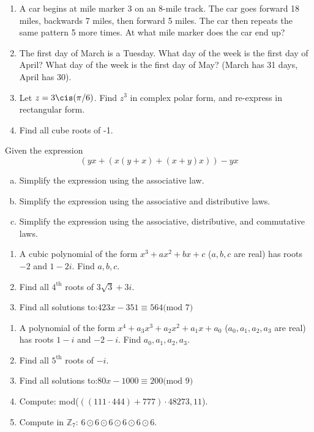 \begin{enumerate}[(1)]
\item
A car begins at mile marker 3 on an 8-mile track.  The car goes forward 18 miles, backwards 7 miles, then forward 5 miles. The car then repeats the same pattern 5 more times.  At what mile marker does the car end up?
\item
The first day of March is a Tuesday.  What day of the week is the first day of April?  What day of the week is the first day of May?  (March has 31 days, April has 30).
\item
Let $z = 3 \cis (\pi/6)$.  Find $z^3$ in complex polar form, and re-express in rectangular form.
\item
Find all cube roots of -1.
\end{enumerate} 

Given the expression
$$ (yx + (x(y+x) + (x+y)x) ) - yx$$
\begin{enumerate}[(a)]
\item
Simplify the expression using the associative law.
\item
Simplify the expression using the associative and distributive laws.
\item
Simplify the expression using the associative, distributive, and commutative laws.
\end{enumerate}

\begin{enumerate}[(1)]
\item
A cubic polynomial of the form $x^3 + ax^2 + bx + c$  ($a,b,c$ are real)  has roots $-2$ and $1 - 2i$.  Find $a,b,c$.
\item
Find all $4^{\text{th}}$ roots of  $3 \sqrt{3} + 3i$.
\item
Find all solutions to:$423 x - 351 \equiv 564 \text{(mod 7)}$
\end{enumerate}

\begin{enumerate}[(1)]
\item
A polynomial of the form $x^4 + a_3x^3 + a_2x^2 + a_1x + a_0$  ($a_0,a_1,a_2,a_3$ are real)  has roots $1-i$ and $-2-i$.  Find $a_0,a_1,a_2,a_3$.
\item
Find all $5^{\text{th}}$ roots of  $-i$.
\item
Find all solutions to:$ 80x - 1000 \equiv 200 \text{(mod 9)}$
\item
Compute:  mod($((111 \cdot 444) + 777) \cdot 48273,11$).
\item
Compute in $\mathbb{Z}_7$:  $6 \odot 6 \odot 6 \odot 6 \odot 6 \odot 6$. 
\end{enumerate}


